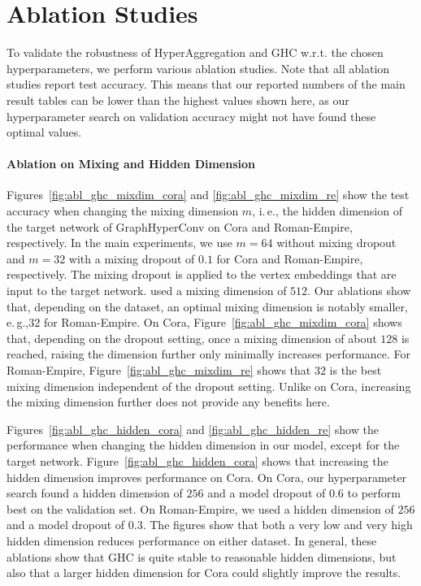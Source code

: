 \documentclass[conference]{IEEEtran}
\newcommand{\ie}{i.\,e.,\xspace}
\newcommand{\eg}{e.\,g.,\xspace}
\begin{document}
\section{Ablation Studies}
\label{sec:ablation}

To validate the robustness of HyperAggregation and GHC w.r.t. the chosen hyperparameters, we perform various ablation studies.
Note that all ablation studies report test accuracy.
This means that our reported numbers of the main result tables can be lower than the highest values shown here, as our hyperparameter search on validation accuracy might not have found these optimal values.

\paragraph*{Ablation on Mixing and Hidden Dimension}

Figures~\ref{fig:abl_ghc_mixdim_cora} and \ref{fig:abl_ghc_mixdim_re} show the test accuracy when changing the mixing dimension $m$, \ie the hidden dimension of the target network of GraphHyperConv on Cora and Roman-Empire, respectively.
In the main experiments, we use $m=64$ without mixing dropout and $m=32$ with a mixing dropout of $0.1$ for Cora and Roman-Empire, respectively.
The mixing dropout is applied to the vertex embeddings that are input to the target network.
\citet{DBLP:conf/acl/MaiPFCMF023} used a mixing dimension of $512$. 
Our ablations show that, depending on the dataset, an optimal mixing dimension is notably smaller, \eg $32$ for Roman-Empire.
On Cora, Figure~\ref{fig:abl_ghc_mixdim_cora} shows that, depending on the dropout setting, once a mixing dimension of about $128$ is reached, raising the dimension further only minimally increases performance.
For Roman-Empire, Figure~\ref{fig:abl_ghc_mixdim_re} shows that $32$ is the best mixing dimension independent of the dropout setting.
Unlike on Cora, increasing the mixing dimension further does not provide any benefits here.

Figures~\ref{fig:abl_ghc_hidden_cora} and \ref{fig:abl_ghc_hidden_re} show the performance when changing the hidden dimension in our model, except for the target network.
Figure~\ref{fig:abl_ghc_hidden_cora} shows that increasing the hidden dimension improves performance on Cora.
On Cora, our hyperparameter search found a hidden dimension of $256$ and a model dropout of $0.6$ to perform best on the validation set.
On Roman-Empire, we used a hidden dimension of $256$ and a model dropout of $0.3$.
The figures show that both a very low and very high hidden dimension reduces performance on either dataset.
In general, these ablations show that GHC is quite stable to reasonable hidden dimensions, but also that a larger hidden dimension for Cora could slightly improve the results.
\end{document}
